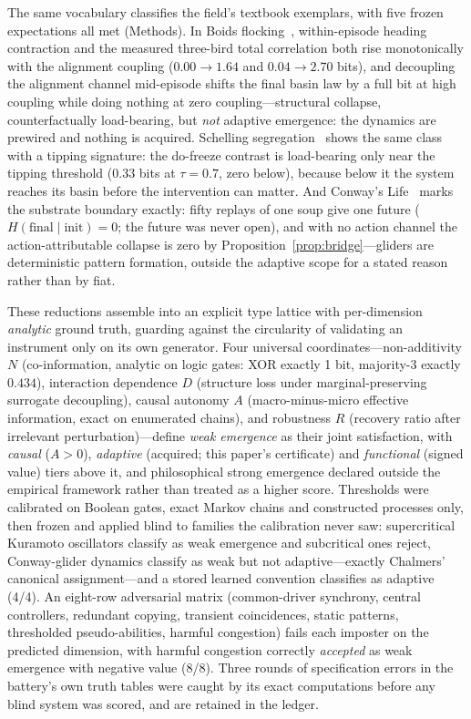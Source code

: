 \documentclass[11pt]{article}
\theoremstyle{definition}
\begin{document}
The same vocabulary classifies the field's textbook exemplars, with
five frozen expectations all met (Methods). In Boids
flocking~\cite{reynolds1987,vicsek1995}, within-episode heading
contraction and the measured three-bird total correlation both rise
monotonically with the alignment coupling ($0.00\to1.64$ and
$0.04\to2.70$ bits), and decoupling the alignment channel mid-episode
shifts the final basin law by a full bit at high coupling while doing
nothing at zero coupling---structural collapse, counterfactually
load-bearing, but \emph{not} adaptive emergence: the dynamics are
prewired and nothing is acquired. Schelling
segregation~\cite{schelling1971} shows the same class with a tipping
signature: the do-freeze contrast is load-bearing only near the
tipping threshold ($0.33$ bits at $\tau=0.7$, zero below), because
below it the system reaches its basin before the intervention can
matter. And Conway's Life~\cite{gardner1970} marks the substrate
boundary exactly: fifty replays of one soup give one future
($H(\text{final} \mid \text{init}) = 0$; the future was never open),
and with no action channel the action-attributable collapse is zero
by Proposition~\ref{prop:bridge}---gliders are deterministic pattern
formation, outside the adaptive scope for a stated reason rather than
by fiat.

These reductions assemble into an explicit type lattice with
per-dimension \emph{analytic} ground truth, guarding against the
circularity of validating an instrument only on its own generator.
Four universal coordinates---non-additivity $N$ (co-information,
analytic on logic gates: XOR exactly 1 bit, majority-3 exactly
$0.434$), interaction dependence $D$ (structure loss under
marginal-preserving surrogate decoupling), causal autonomy $A$
(macro-minus-micro effective information, exact on enumerated
chains), and robustness $R$ (recovery ratio after irrelevant
perturbation)---define \emph{weak emergence} as their joint
satisfaction, with \emph{causal} ($A>0$), \emph{adaptive} (acquired;
this paper's certificate) and \emph{functional} (signed value) tiers
above it, and philosophical strong emergence declared outside the
empirical framework rather than treated as a higher score. Thresholds
were calibrated on Boolean gates, exact Markov chains and constructed
processes only, then frozen and applied blind to families the
calibration never saw: supercritical Kuramoto oscillators classify as
weak emergence and subcritical ones reject, Conway-glider dynamics
classify as weak but not adaptive---exactly Chalmers' canonical
assignment---and a stored learned convention classifies as adaptive
(4/4). An eight-row adversarial matrix (common-driver synchrony,
central controllers, redundant copying, transient coincidences,
static patterns, thresholded pseudo-abilities, harmful congestion)
fails each imposter on the predicted dimension, with harmful
congestion correctly \emph{accepted} as weak emergence with negative
value (8/8). Three rounds of specification errors in the battery's
own truth tables were caught by its exact computations before any
blind system was scored, and are retained in the ledger.
\end{document}
